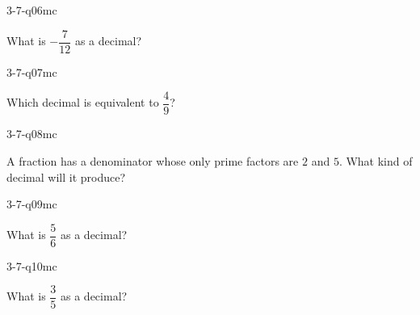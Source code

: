 \begin{practiceQuestion}{3-7-q06}{mc}
\begin{questionText}
What is $-\dfrac{7}{12}$ as a decimal?
\end{questionText}
\end{practiceQuestion}

\begin{practiceQuestion}{3-7-q07}{mc}
\begin{questionText}
Which decimal is equivalent to $\dfrac{4}{9}$?
\end{questionText}
\end{practiceQuestion}

\begin{practiceQuestion}{3-7-q08}{mc}
\begin{questionText}
A fraction has a denominator whose only prime factors are $2$ and $5$. What kind of decimal will it produce?
\end{questionText}
\end{practiceQuestion}

\begin{practiceQuestion}{3-7-q09}{mc}
\begin{questionText}
What is $\dfrac{5}{6}$ as a decimal?
\end{questionText}
\end{practiceQuestion}

\begin{practiceQuestion}{3-7-q10}{mc}
\begin{questionText}
What is $\dfrac{3}{5}$ as a decimal?
\end{questionText}
\end{practiceQuestion}

